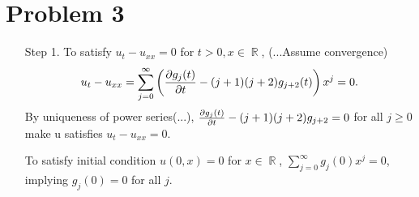 \documentclass{article}
\DeclareMathOperator{\rr}{\mathbb{R}}
\begin{document}
\section*{Problem 3}
\begin{enumerate}
\item[Step 1.] To satisfy $u_t-u_{xx}=0$ for $t>0, x\in \rr$, (...Assume convergence) 
\begin{equation*}
u_t-u_{xx}=\sum_{j=0}^\infty \left(\pdv{g_j(t)}{t}-(j+1)(j+2)g_{j+2}(t)\right)x^{j}=0.
\end{equation*}
By uniqueness of power series(...), $\pdv{g_j(t)}{t}-(j+1)(j+2)g_{j+2}=0$ for all $j\geq 0$ make u satisfies $u_t-u_{xx}=0$.

To satisfy initial condition $u(0, x)=0$ for $x\in \rr$, $\sum_{j=0}^\infty g_j(0)x^j=0$, implying $g_j(0)=0$ for all $j$.


\end{enumerate}
\end{document}
